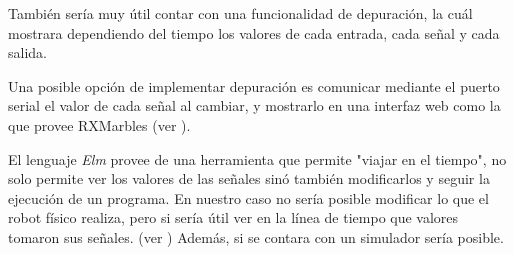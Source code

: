   También sería muy útil contar con una funcionalidad de depuración, la cuál
mostrara dependiendo del tiempo los valores de cada entrada, cada señal y cada
salida.

  Una posible opción de implementar depuración es comunicar
mediante el puerto serial el valor de cada señal al cambiar,
y mostrarlo en una interfaz web como la que provee
RXMarbles (ver \cite{rxmarbles}). 

  El lenguaje \textit{Elm} provee de una herramienta que permite "viajar en el 
tiempo", no solo permite ver los valores de las señales sinó también
modificarlos y seguir la ejecución de un programa.
  En nuestro caso no sería posible modificar lo que el robot físico
realiza, pero si sería útil ver en la línea de tiempo que valores
tomaron sus señales. (ver \cite{elmdebug}) Además, si se contara
con un simulador sería posible.

